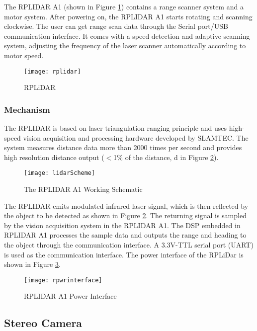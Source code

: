 The RPLIDAR A1 (shown in Figure \ref{fig:rplidar}) contains a range scanner system and a motor system. After powering on, the RPLIDAR A1 starts rotating and scanning clockwise. The user can get range scan data through the Serial port/USB communication interface. It comes with a speed detection and adaptive scanning system, adjusting the frequency of the laser scanner automatically according to motor speed.

\begin{figure}[H]
    \centering
        \texttt{[image: rplidar]}
        \caption{RPLiDAR}
        \label{fig:rplidar}
\end{figure}

\subsubsection{Mechanism}
The RPLIDAR is based on laser triangulation ranging principle and uses high-speed vision acquisition and processing hardware developed by SLAMTEC. The system measures distance data more than 2000 times per second and provides high resolution distance output (\(<\)1\% of the distance, d in Figure \ref{fig:lidarScheme}). 

\begin{figure}[H]
    \centering
        \texttt{[image: lidarScheme]}
        \caption{The RPLIDAR A1 Working Schematic}
        \label{fig:lidarScheme}
\end{figure} 

The RPLIDAR emits modulated infrared laser signal, which is then reflected by the object to be detected as shown in Figure \ref{fig:lidarScheme}. The returning signal is sampled by the vision acquisition system in the RPLIDAR A1. The DSP embedded in RPLIDAR A1 processes the sample data and outputs the range and heading to the object through the communication interface. A 3.3V-TTL serial port (UART) is used as the communication interface. The power interface of the RPLiDar is shown in Figure \ref{fig:rpwrinterface}.

\begin{figure}[H]
    \centering
        \texttt{[image: rpwrinterface]}
        \caption{RPLIDAR A1 Power Interface}
        \label{fig:rpwrinterface}
\end{figure}


\newpage
\subsection{Stereo Camera}
